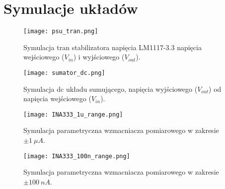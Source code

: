 \section{Symulacje układów}
    \begin{figure}[!ht]
        \centering
        \texttt{[image: psu\_tran.png]}
        \caption{Symulacja tran stabilizatora napięcia LM1117-3.3 napięcia wejściowego ($V_{in}$) i wyjściowego ($V_{out}$).}
        \label{fig:sym_LM1117}
    \end{figure}
    \begin{figure}[!ht]
        \centering
        \texttt{[image: sumator\_dc.png]}
        \caption{Symulacja dc układu sumującego, napięcia wyjściowego ($V_{out}$) od napięcia wejściowego ($V_{in}$).}
        \label{fig:sym_sum}
    \end{figure}
    \begin{figure}[!ht]
        \centering
        \texttt{[image: INA333\_1u\_range.png]}
        \caption{Symulacja parametryczna wzmacniacza pomiarowego w zakresie $\pm 1\ \mu A$.}
        \label{fig:sym_INA_1u}
    \end{figure}
    \begin{figure}[!ht]
        \centering
        \texttt{[image: INA333\_100n\_range.png]}
        \caption{Symulacja parametryczna wzmacniacza pomiarowego w zakresie $\pm 100\ nA$.}
        \label{fig:sym_INA_100n}
    \end{figure}
